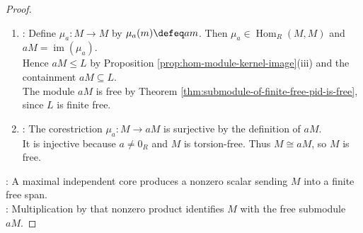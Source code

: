 \begin{theorem}
\begin{proof}
\begin{enumerate}[label=\roman*.]
\begin{enumerate}[label=(\alph*)]
Together with $av_i\in L$ for $1\leq i\leq k$, these relations imply $(\forall u\in G)\,[au\in L]$. Since $G$ generates $M$, one has $aM\subseteq L$.
\item {}: Define $\mu_a:M\to M$ by $\mu_a(m)\defeq am$. Then $\mu_a\in\operatorname{Hom}_R(M,M)$ and $aM=\operatorname{im}(\mu_a)$.\\
Hence $aM\leq L$ by Proposition \ref{prop:hom-module-kernel-image}(iii) and the containment $aM\subseteq L$.\\
The module $aM$ is free by Theorem \ref{thm:submodule-of-finite-free-pid-is-free}, since $L$ is finite free.
\item {}: The corestriction $\mu_a:M\to aM$ is surjective by the definition of $aM$.\\
It is injective because $a\neq0_R$ and $M$ is torsion-free. Thus $M\cong aM$, so $M$ is free.
\end{enumerate}
\end{enumerate}
\noindent
{}: A maximal independent core produces a nonzero scalar sending $M$ into a finite free span.\\
: Multiplication by that nonzero product identifies $M$ with the free submodule $aM$.
\end{proof}
\end{theorem}

